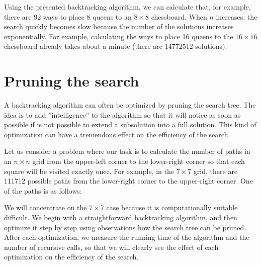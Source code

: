 Using the presented backtracking
algorithm, we can calculate that,
for example, there are 92 ways to place 8
queens to an $8 \times 8$ chessboard.
When $n$ increases, the search quickly becomes slow
because the number of the solutions increases
exponentially.
For example, calculating the ways to
place 16 queens to the $16 \times 16$
chessboard already takes about a minute
(there are 14772512 solutions).

\section{Pruning the search}

A backtracking algorithm can often be optimized
by pruning the search tree.
The idea is to add ''intelligence'' to the algorithm
so that it will notice as soon as possible
if is not possible to extend a subsolution into
a full solution.
This kind of optimization can have a tremendous
effect on the efficiency of the search.

Let us consider a problem where
our task is to calculate the number of paths
in an $n \times n$ grid from the upper-left corner
to the lower-right corner so that each square
will be visited exactly once.
For example, in the $7 \times 7$ grid,
there are 111712 possible paths from the
lower-right corner to the upper-right corner.
One of the paths is as follows:

\begin{center}
\end{center}

We will concentrate on the $7 \times 7$ case
because it is computationally suitable difficult.
We begin with a straightforward backtracking algorithm,
and then optimize it step by step using observations
how the search tree can be pruned.
After each optimization, we measure the running time
of the algorithm and the number of recursive calls,
so that we will clearly see the effect of each
optimization on the efficiency of the search.

